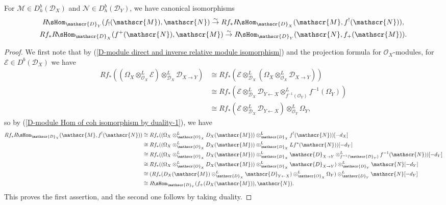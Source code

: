 \begin{theorem}\label{D-module adjunction of six functor for holonomic module}
For $\mathscr{M}\in D_h^b(\mathscr{D}_X)$ and $\mathscr{N}\in D^b_h(\mathscr{D}_Y)$, we have canonical isomorphisms
\begin{gather*}
R\!\sHom_{\mathscr{D}_Y}(f_!(\mathscr{M}),\mathscr{N})\stackrel{\sim}{\to} Rf_*R\!\sHom_{\mathscr{D}_X}(\mathscr{M},f^!(\mathscr{N})),\\
Rf_*R\!\sHom_{\mathscr{D}_X}(f^+(\mathscr{N}),\mathscr{M})\stackrel{\sim}{\to} R\!\sHom_{\mathscr{D}_Y}(\mathscr{N},f_+(\mathscr{M})).
\end{gather*}
\end{theorem}
\begin{proof}
We first note that by (\ref{D-module direct and inverse relative module isomorphism}) and the projection formula for $\mathscr{O}_X$-modules, for $\mathscr{E}\in D^b(\mathscr{D}_X)$ we have
\begin{align*}
Rf_*((\Omega_X\otimes_{\mathscr{O}_X}^L\mathscr{E})\otimes_{\mathscr{D}_X}^L\mathscr{D}_{X\to Y})&\cong Rf_*(\mathscr{E}\otimes_{\mathscr{D}_X}^L(\Omega_X\otimes_{\mathscr{O}_X}^L\mathscr{D}_{X\to Y}))\\
&\cong Rf_*(\mathscr{E}\otimes_{\mathscr{D}_X}^L\mathscr{D}_{Y\leftarrow X}\otimes_{f^{-1}(\mathscr{O}_Y)}^Lf^{-1}(\Omega_Y))\\
&\cong Rf_*(\mathscr{E}\otimes_{\mathscr{D}_X}^L\mathscr{D}_{Y\leftarrow X})\otimes_{\mathscr{O}_Y}^L\Omega_Y,
\end{align*}
so by (\ref{D-module Hom of coh isomorphism by duality-1}), we have
\begin{align*}
Rf_*R\!\sHom_{\mathscr{D}_X}(\mathscr{M},f^!(\mathscr{N}))&\cong Rf_*((\Omega_X\otimes_{\mathscr{O}_X}^LD_X(\mathscr{M}))\otimes_{\mathscr{D}_X}^Lf^!(\mathscr{N}))[-d_X]\\
&\cong Rf_*((\Omega_X\otimes_{\mathscr{O}_X}^LD_X(\mathscr{M}))\otimes_{\mathscr{D}_X}^LLf^*(\mathscr{N}))[-d_Y]\\
&\cong Rf_*((\Omega_X\otimes_{\mathscr{O}_X}^LD_X(\mathscr{M}))\otimes_{\mathscr{D}_X}^L\mathscr{D}_{X\to Y}\otimes_{f^{-1}(\mathscr{D}_Y)}^Lf^{-1}(\mathscr{N}))[-d_Y]\\
&\cong Rf_*((\Omega_X\otimes_{\mathscr{O}_X}^LD_X(\mathscr{M}))\otimes_{\mathscr{D}_X}^L\mathscr{D}_{X\to Y})\otimes_{\mathscr{D}_Y}^L\mathscr{N}[-d_Y]\\
&\cong (Rf_*(D_X(\mathscr{M})\otimes_{\mathscr{D}_X}^L\mathscr{D}_{Y\leftarrow X})\otimes_{\mathscr{O}_X}^L\Omega_Y)\otimes_{\mathscr{D}_Y}^L\mathscr{N}[-d_Y]\\
&\cong R\!\sHom_{\mathscr{D}_Y}(f_+(D_X(\mathscr{M})),\mathscr{N}).
\end{align*} 
This proves the first assertion, and the second one follows by taking duality.
\end{proof}

